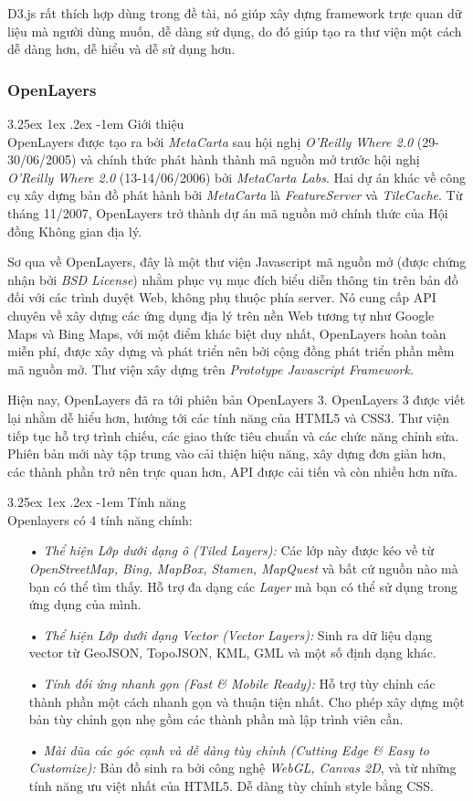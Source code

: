 \documentclass[12pt,a4paper,twoside]{article}
\makeatletter
\newcommand{\myparagraph}[1]{\paragraph{#1}\mbox{}\\} %
\renewcommand\paragraph{\@startsection{paragraph}{5}{\z@}%
  {3.25ex \@plus1ex \@minus.2ex}%
  {-1em}%
  {\normalfont\normalsize\bfseries}}
\makeatother
\begin{document}
D3.js rất thích hợp dùng trong đề tài, nó giúp xây dựng framework trực quan dữ liệu mà người dùng muốn, dễ dàng sử dụng, do đó giúp tạo ra thư viện một cách dễ dàng hơn, dễ hiểu và dễ sử dụng hơn.

\subsubsection{OpenLayers}
\myparagraph{Giới thiệu}
OpenLayers\cite{ol} được tạo ra bởi \textit{MetaCarta} sau hội nghị \textit{O'Reilly Where 2.0} (29-30/06/2005) và chính thức phát hành thành mã nguồn mở trước hội nghị  \textit{O'Reilly Where 2.0} (13-14/06/2006) bởi \textit{MetaCarta Labs}. Hai dự án khác về công cụ xây dựng bản đồ phát hành bởi \textit{MetaCarta} là \textit{FeatureServer} và \textit{TileCache}. Từ tháng 11/2007, OpenLayers trở thành dự án mã nguồn mở chính thức của Hội đồng Không gian địa lý.

Sơ qua về OpenLayers, đây là một thư viện Javascript mã nguồn mở (được chứng nhận bởi \textit{BSD License}) nhằm phục vụ mục đích biểu diễn thông tin trên bản đồ  đối với các trình duyệt Web, không phụ thuộc phía server. Nó cung cấp API chuyên về xây dựng các ứng dụng địa lý trên nền Web tương tự như Google Maps và Bing Maps, với một điểm khác biệt duy nhất, OpenLayers hoàn toàn miễn phí, được xây dựng và phát triển nên bởi cộng đồng phát triển phần mềm mã nguồn mở. Thư viện xây dựng trên \textit{Prototype Javascript Framework}\citep{prototypejs}.

Hiện nay, OpenLayers đã ra tới phiên bản OpenLayers 3. OpenLayers 3 được viết lại nhằm dễ hiểu hơn, hướng tới các tính năng của HTML5 và CSS3. Thư viện tiếp tục hỗ trợ trình chiếu, các giao thức tiêu chuẩn và các chức năng chỉnh sửa. Phiên bản mới này tập trung vào cải thiện hiệu năng, xây dựng đơn giản hơn, các thành phần trở nên trực quan hơn, API được cải tiến và còn nhiều hơn nữa.

\myparagraph{Tính năng}
Openlayers có 4 tính năng chính:
\begin{itemize}
\item[•] \emph{Thể hiện Lớp dưới dạng ô (Tiled Layers):} Các lớp này được kéo về từ \textit{OpenStreetMap, Bing, MapBox, Stamen, MapQuest} và bất cứ nguồn nào mà bạn có thể tìm thấy. Hỗ trợ đa dạng các \textit{Layer} mà bạn có thể sử dụng trong ứng dụng của mình.
\item[•] \emph{Thể hiện Lớp dưới dạng Vector (Vector Layers):} Sinh ra dữ liệu dạng vector từ GeoJSON, TopoJSON, KML, GML và một số định dạng khác.
\item[•] \emph{Tính đối ứng nhanh gọn (Fast \& Mobile Ready):} Hỗ trợ tùy chỉnh các thành phần một cách nhanh gọn và thuận tiện nhất. Cho phép xây dựng một bản tùy chỉnh gọn nhẹ gồm các thành phần mà lập trình viên cần.
\item[•] \emph{Mài dũa các góc cạnh và dễ dàng tùy chỉnh (Cutting Edge \& Easy to Customize):} Bản đồ sinh ra bởi công nghệ \textit{WebGL, Canvas 2D}, và từ những tính năng ưu việt nhất của HTML5. Dễ dàng tùy chỉnh style bằng CSS.
\end{itemize}
\end{document}
